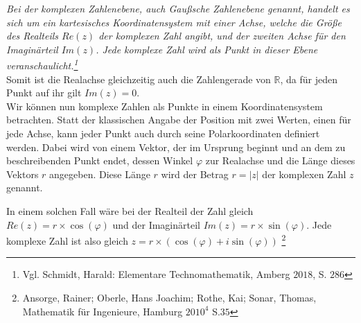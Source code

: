 \documentclass[a4paper,12pt]{article} %
\begin{document}
\noindent \emph{Bei der komplexen Zahlenebene, auch Gaußsche Zahlenebene genannt, handelt es sich um ein kartesisches Koordinatensystem mit einer Achse, welche die Größe des Realteils $Re(z)$ der komplexen Zahl angibt, und der zweiten Achse für den Imaginärteil $Im(z)$. Jede komplexe Zahl wird als Punkt in dieser Ebene veranschaulicht.\footnote{Vgl. Schmidt, Harald: Elementare Technomathematik, Amberg $2018$, S. $286$}}\\


Somit ist die Realachse gleichzeitig auch die Zahlengerade von $\mathbb{R}$, da für jeden Punkt auf ihr gilt $Im(z)=0$.\\



Wir können nun komplexe Zahlen als Punkte in einem Koordinatensystem betrachten.
Statt der klassischen Angabe der Position mit zwei Werten, einen für jede Achse, kann jeder Punkt auch durch seine Polarkoordinaten definiert werden.
Dabei wird von einem Vektor, der im Ursprung beginnt und an dem zu beschreibenden Punkt endet, dessen Winkel $\varphi$ zur Realachse und die Länge dieses Vektors $r$ angegeben. Diese Länge $r$ wird der Betrag $r=|z|$ der komplexen Zahl $z$ genannt.

In einem solchen Fall wäre bei der Realteil der Zahl gleich $Re(z)=r\times\cos(\varphi)$ und der Imaginärteil $Im(z)=r\times\sin(\varphi)$.
Jede komplexe Zahl ist also gleich $z=r\times(\cos(\varphi)+i\sin(\varphi))$
\footnote{Ansorge, Rainer; Oberle, Hans Joachim; Rothe, Kai; Sonar, Thomas, Mathematik für Ingenieure, Hamburg $2010^4$ S.$35$}
\end{document}
